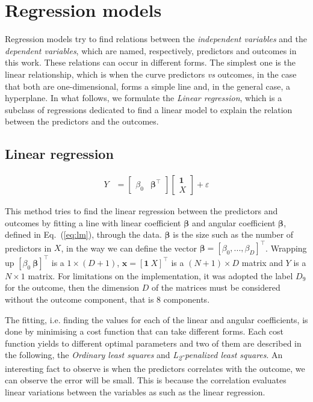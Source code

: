 \documentclass[conference]{IEEEtran}
\begin{document}
\section{Regression models}\label{sec:rm}

Regression models try to find relations between the \emph{independent variables} and the \emph{dependent variables}, which are named, respectively, predictors and outcomes in this work. These relations can occur in different forms. The simplest one is the linear relationship, which is when the curve predictors \textit{vs} outcomes, in the case that both are one-dimensional, forms a simple line and, in the general case, a hyperplane. In what follows, we formulate the \emph{Linear regression}, which is a subclass of regressions dedicated to find a linear model to explain the relation between the predictors and the outcomes. 


\subsection{Linear regression}

\begin{align} \label{eq:lm}   
  Y &= \begin{bmatrix} 
        \beta_0 & \boldsymbol{\beta}^\top 
       \end{bmatrix} 
       \begin{bmatrix} 
        \mathbf{1} \\ X 
      \end{bmatrix} + \varepsilon
\end{align} 

This method tries to find the linear regression between the predictors and outcomes by fitting a line with linear coefficient $\boldsymbol{\beta}$ and angular coefficient $\boldsymbol{\beta}$, defined in Eq.~(\ref{eq:lm}), through the data. $\boldsymbol{\beta}$ is the size such as the number of predictors in $X$, in the way we can define the vector $\boldsymbol{\beta} = [\beta_0, ..., \beta_D]^\top$. Wrapping up $[\beta_0 \ \boldsymbol{\beta}]^\top$ is a $1\times (D+1)$, $\mathbf{x} = [\mathbf{1} \ X]^\top$ is a $(N+1)\times D$ matrix and $Y$ is a $N\times 1$ matrix. For limitations on the implementation, it was adopted the label $D_9$ for the outcome, then the dimension $D$ of the matrices must be considered without the outcome component, that is 8 components.

The fitting, i.e. finding the values for each of the linear and angular coefficients, is done by minimising a cost function that can take different forms. Each cost function yields to different optimal parameters and two of them are described in the following, the \emph{Ordinary least squares} and \emph{L\textsubscript{2}-penalized least squares}. An interesting fact to observe is when the predictors correlates with the outcome, we can observe the error will be small. This is because the correlation evaluates linear variations between the variables as such as the linear regression.
\end{document}
